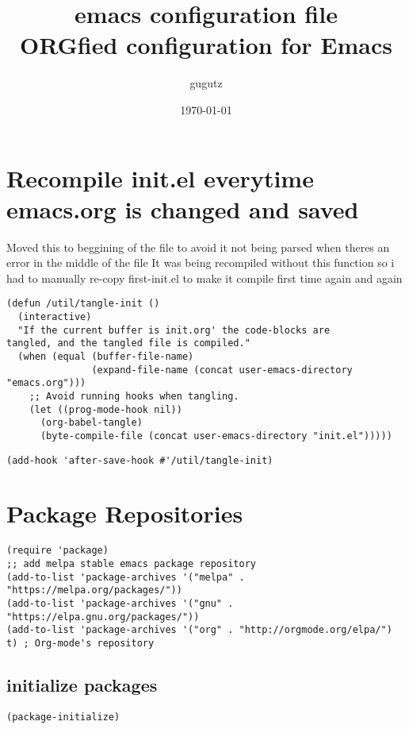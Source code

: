 \documentclass[11pt]{article}
\author{gugutz}
\date{\today}
\title{emacs configuration file\\\medskip
\large ORGfied configuration for Emacs}
\begin{document}
\maketitle
\setcounter{tocdepth}{0}
\tableofcontents


\section*{Recompile init.el everytime emacs.org is changed and saved}
\label{sec:org4cc40c2}

   Moved this to beggining of the file to avoid it not being parsed when theres an error in the middle of the file
It was being recompiled without this function so i had to manually re-copy first-init.el to make it compile first time again and again


\begin{verbatim}
(defun /util/tangle-init ()
  (interactive)
  "If the current buffer is init.org' the code-blocks are
tangled, and the tangled file is compiled."
  (when (equal (buffer-file-name)
               (expand-file-name (concat user-emacs-directory "emacs.org")))
    ;; Avoid running hooks when tangling.
    (let ((prog-mode-hook nil))
      (org-babel-tangle)
      (byte-compile-file (concat user-emacs-directory "init.el")))))
\end{verbatim}

\begin{verbatim}
(add-hook 'after-save-hook #'/util/tangle-init)
\end{verbatim}


\section*{Package Repositories}
\label{sec:org5fc04d2}

\begin{verbatim}
(require 'package)
;; add melpa stable emacs package repository
(add-to-list 'package-archives '("melpa" . "https://melpa.org/packages/"))
(add-to-list 'package-archives '("gnu" . "https://elpa.gnu.org/packages/"))
(add-to-list 'package-archives '("org" . "http://orgmode.org/elpa/") t) ; Org-mode's repository
\end{verbatim}

\subsection*{initialize packages}
\label{sec:orgfd4f04e}
\begin{verbatim}
(package-initialize)
\end{verbatim}
\end{document}
